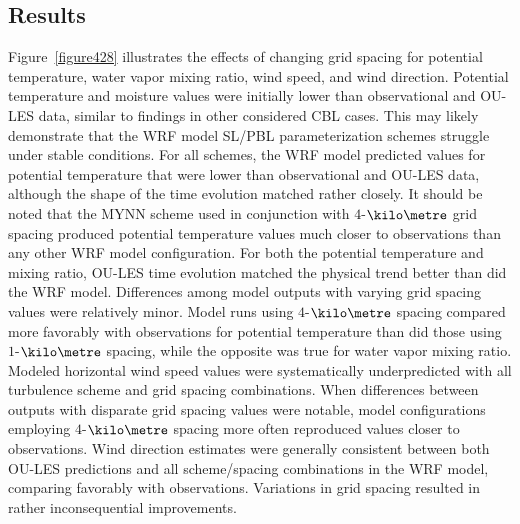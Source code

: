 \subsection{Results}
\label{res-462}

Figure~\ref{figure428} illustrates the effects of changing grid spacing for potential temperature, water vapor mixing ratio, wind speed, and wind direction. Potential temperature and moisture values were initially lower than observational and OU-LES data, similar to findings in other considered CBL cases. This may likely demonstrate that the WRF model SL\slash PBL parameterization schemes struggle under stable conditions. For all schemes, the WRF model predicted values for potential temperature that were lower than observational and OU-LES data, although the shape of the time evolution matched rather closely. It should be noted that the MYNN scheme used in conjunction with $4$-$\kilo\metre$ grid spacing produced potential temperature values much closer to observations than any other WRF model configuration. For both the potential temperature and mixing ratio, OU-LES time evolution matched the physical trend better than did the WRF model. Differences among model outputs with varying grid spacing values were relatively minor. Model runs using $4$-$\kilo\metre$ spacing compared more favorably with observations for potential temperature than did those using $1$-$\kilo\metre$ spacing, while the opposite was true for water vapor mixing ratio. Modeled horizontal wind speed values were systematically underpredicted with all turbulence scheme and grid spacing combinations. When differences between outputs with disparate grid spacing values were notable, model configurations employing $4$-$\kilo\metre$ spacing more often reproduced values closer to observations. Wind direction estimates were generally consistent between both OU-LES predictions and all scheme\slash spacing combinations in the WRF model, comparing favorably with observations. Variations in grid spacing resulted in rather inconsequential improvements.



